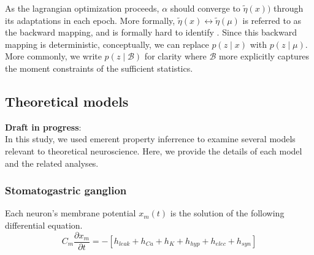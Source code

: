 \documentclass[11pt]{article}
\begin{document}
As the lagrangian optimization proceeds, $\alpha$ should converge to $\tilde{\eta}(x))$ through its adaptations in each epoch.  More formally, $\tilde{\eta}(x) \leftrightarrow \tilde{\eta}(\mu)$ is referred to as the backward mapping, and is formally hard to identify \cite{wainwright2008graphical}.  Since this backward mapping is deterministic, conceptually, we can replace $p(z \mid x)$ with $p(z \mid \mu)$.  More commonly, we write $p(z \mid \mathcal{B})$ for clarity where $\mathcal{B}$ more explicitly captures the moment constraints of the sufficient statistics.

\subsection{Theoretical models}\label{methods_theoretical_models}
\textbf{Draft in progress}: \\
In this study, we used emerent property inferrence to examine several models relevant to theoretical neuroscience.  Here, we provide the details of each model  and the related analyses.

\subsubsection{Stomatogastric ganglion}\label{methods_STG}
Each neuron's membrane potential $x_m(t)$ is the solution of the following differential equation.
\begin{equation} C_m \frac{\partial x_m}{\partial t} = - \left[ h_{leak} + h_{Ca} + h_K + h_{hyp} + h_{elec} + h_{syn}\right] 
\end{equation} 
\end{document}
